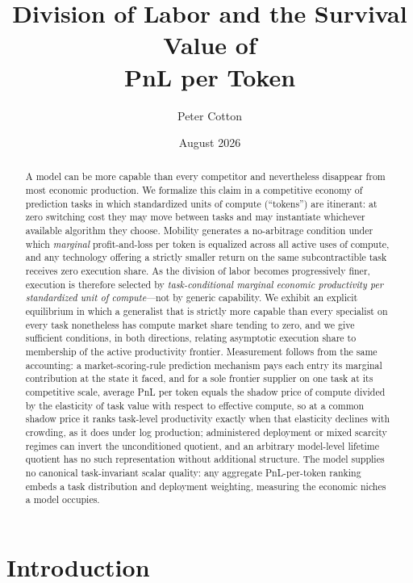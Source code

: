 \documentclass[11pt]{article}
\title{Division of Labor and the Survival Value of\\ PnL per Token}
\author{Peter Cotton}
\date{August 2026}
\theoremstyle{definition}
\theoremstyle{remark}
\begin{document}
\maketitle

\begin{abstract}
A model can be more capable than every competitor and nevertheless disappear from most economic production. We formalize this claim in a competitive economy of prediction tasks in which standardized units of compute (``tokens'') are itinerant: at zero switching cost they may move between tasks and may instantiate whichever available algorithm they choose. Mobility generates a no-arbitrage condition under which \emph{marginal} profit-and-loss per token is equalized across all active uses of compute, and any technology offering a strictly smaller return on the same subcontractible task receives zero execution share. As the division of labor becomes progressively finer, execution is therefore selected by \emph{task-conditional marginal economic productivity per standardized unit of compute}---not by generic capability. We exhibit an explicit equilibrium in which a generalist that is strictly more capable than every specialist on every task nonetheless has compute market share tending to zero, and we give sufficient conditions, in both directions, relating asymptotic execution share to membership of the active productivity frontier. Measurement follows from the same accounting: a market-scoring-rule prediction mechanism pays each entry its marginal contribution at the state it faced, and for a sole frontier supplier on one task at its competitive scale, average PnL per token equals the shadow price of compute divided by the elasticity of task value with respect to effective compute, so at a common shadow price it ranks task-level productivity exactly when that elasticity declines with crowding, as it does under log production; administered deployment or mixed scarcity regimes can invert the unconditioned quotient, and an arbitrary model-level lifetime quotient has no such representation without additional structure. The model supplies no canonical task-invariant scalar quality: any aggregate PnL-per-token ranking embeds a task distribution and deployment weighting, measuring the economic niches a model occupies.
\end{abstract}

\section{Introduction}
\end{document}
